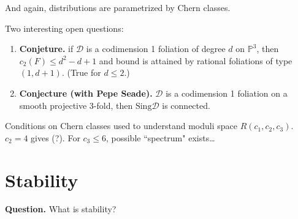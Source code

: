 And again, distributions are parametrized by Chern classes.

Two interesting open questions:
\begin{enumerate}
\item {\bf Conjeture.} if $\mathcal{D}$ is a codimension 1 foliation of degree
$d$ on $\mathbb{P}^3$, then $c_2(F)\leq d^2-d+1$ and bound is attained
by rational foliations of type $(1,d+1)$. (True for $d \leq 2$.)
\item {\bf Conjecture (with Pepe Seade).} $\mathcal{D}$ is a codimension 1 
foliation on a smooth projective 3-fold, then $\text{Sing}\mathcal{D}$ is connected.
\end{enumerate}

\begin{theorem}
\label{theorem-jardim-muniz}
Conditions on Chern classes used to understand moduli space $R(c_1,c_2,c_3)$.
$c_2=4$ gives (?). For $c_3\leq 6$, possible ``spectrum" exists…
\end{theorem}

\section{Stability}
\label{section-stability}

{\bf Question.} What is stability?

